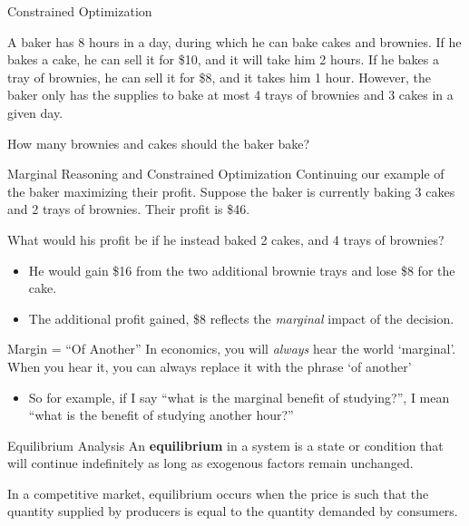 \documentclass[11pt,t]{beamer}
\begin{document}
\begin{frame}{Constrained Optimization}

  \bigskip
  A baker has 8 hours in a day, during which he can bake cakes and brownies. If he bakes a cake, he can sell it for \$10, and it will take him 2 hours. If he bakes a tray of brownies, he can sell it for \$8, and it takes him 1 hour. However, the baker only has the supplies to bake at most 4 trays of brownies and 3 cakes in a given day. 
  
  \medskip
  How many brownies and cakes should the baker bake?
\end{frame}

\begin{frame}
  
\end{frame}

\begin{frame}{Marginal Reasoning and Constrained Optimization}
  Continuing our example of the baker maximizing their profit. Suppose the baker is currently baking 3 cakes and 2 trays of brownies. Their profit is \$46.

  \bigskip
  What would his profit be if he instead baked 2 cakes, and 4 trays of brownies? 

  \begin{itemize}
    \item He would gain \$16 from the two additional brownie trays and lose \$8 for the cake.
    \item The additional profit gained, \$8 reflects the \textit{marginal} impact of the decision.
  \end{itemize}
\end{frame}

\begin{frame}{Margin = ``Of Another''}
  In economics, you will \emph{always} hear the world `marginal'. When you hear it, you can always replace it with the phrase `of another'

  \begin{itemize}
    \item So for example, if I say ``what is the marginal benefit of studying?'', I mean ``what is the benefit of studying another hour?''
  \end{itemize}
\end{frame}

\begin{frame}{Equilibrium Analysis}
  An \textbf{equilibrium} in a system is a state or condition that will continue indefinitely as long as exogenous factors remain unchanged.

  \bigskip
  In a competitive market, equilibrium occurs when the price is such that the quantity supplied by producers is equal to the quantity demanded by consumers.
\end{frame}
\end{document}
